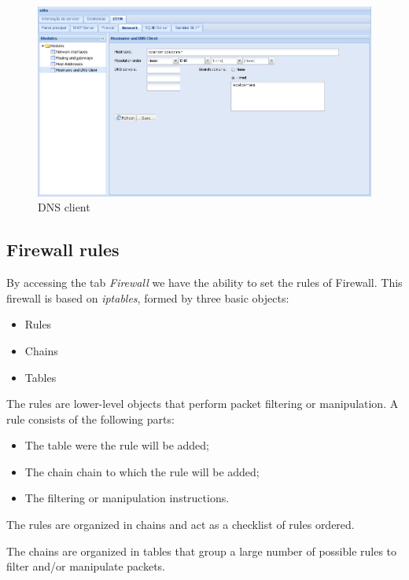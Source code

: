 \begin{figure}[H]
    \begin{center}
    \includegraphics[scale=0.38]{screenshots/etfw/etfw_network_dnsclient_01.png}
    \caption{DNS client}
    \label{fig:etfw_network_dnsclient_01}
    \end{center}
\end{figure}

\subsection{Firewall rules}
By accessing the tab \textit{Firewall} we have the ability to set the rules of Firewall.
This firewall is based on \textit{iptables}, formed by three basic objects:

\begin{itemize}
    \item Rules
    \item Chains
    \item Tables
\end{itemize}

The rules are lower-level objects that perform packet filtering or manipulation.
A rule consists of the following parts:

\begin{itemize}
\item The table were the rule will be added;
\item The chain chain to which the rule will be added;
\item The filtering or manipulation instructions.
\end{itemize}

The rules are organized in chains and act as a checklist of rules ordered.

The chains are organized in tables that group a large number of possible rules to filter and/or manipulate packets.

